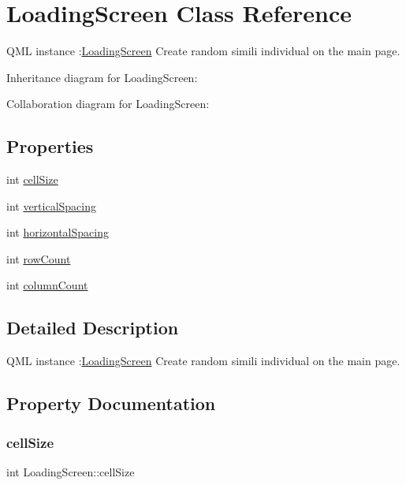 \hypertarget{class_loading_screen}{}\section{Loading\+Screen Class Reference}
\label{class_loading_screen}


Q\+ML instance \+:\hyperlink{class_loading_screen}{Loading\+Screen} Create random simili individual on the main page.  




Inheritance diagram for Loading\+Screen\+:


Collaboration diagram for Loading\+Screen\+:
\subsection*{Properties}
\begin{DoxyCompactItemize}
\item 
int \hyperlink{class_loading_screen_a58f6f5c34f4f6a8cde923acc1236f95f}{cell\+Size}
\item 
int \hyperlink{class_loading_screen_adf429228d3c540ccab99be13065b11af}{vertical\+Spacing}
\item 
int \hyperlink{class_loading_screen_a7764e6e7ad13a3e845dd725ce09f668f}{horizontal\+Spacing}
\item 
int \hyperlink{class_loading_screen_a7f56e8b4ae8c0473e29c138e553fc107}{row\+Count}
\item 
int \hyperlink{class_loading_screen_af670b970607a9e4bea04e93b02e9062c}{column\+Count}
\end{DoxyCompactItemize}


\subsection{Detailed Description}
Q\+ML instance \+:\hyperlink{class_loading_screen}{Loading\+Screen} Create random simili individual on the main page. 

\subsection{Property Documentation}
\mbox{\label{class_loading_screen_a58f6f5c34f4f6a8cde923acc1236f95f}} 
\subsubsection{\texorpdfstring{cell\+Size}{cellSize}}
{\footnotesize\ttfamily int Loading\+Screen\+::cell\+Size}

